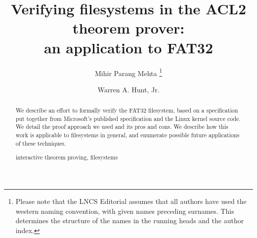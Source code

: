 \documentclass[runningheads,a4paper]{llncs}
\newcommand{\keywords}[1]{\par\addvspace\baselineskip
\noindent\keywordname\enspace\ignorespaces#1}
\begin{document}
\mainmatter  %

\title{Verifying filesystems in the ACL2 theorem prover:\\ an
  application to FAT32}


%
%
\author{Mihir Parang Mehta%
\thanks{Please note that the LNCS Editorial assumes that all authors have used
the western naming convention, with given names preceding surnames. This determines
the structure of the names in the running heads and the author index.}%
\and Warren A. Hunt, Jr.}
%


%
%

\maketitle


\begin{abstract}
  We describe an effort to formally verify the FAT32 filesystem, based
  on a specification put together from Microsoft's published
  specification and the Linux kernel source code. We detail the proof
  approach we used and its pros and cons. We describe how this
  work is applicable to filesystems in general, and enumerate possible
  future applications of these techniques.
\keywords{interactive theorem proving, filesystems}
\end{abstract}
\end{document}
